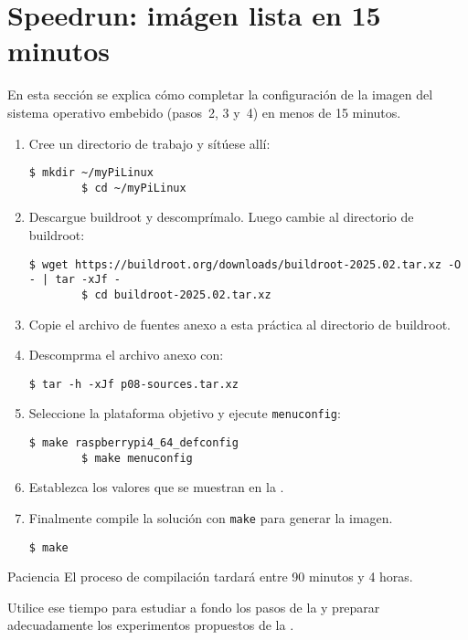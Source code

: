 %
%

\section{Speedrun: imágen lista en 15 minutos}%
\label{sec:speedrun}

En esta sección se explica cómo completar la configuración de la imagen del sistema operativo embebido (pasos~2, 3 y~4) en menos de 15 minutos.

\begin{enumerate}
	\item Cree un directorio de trabajo y sítúese allí:
	\begin{Verbatim}[gobble=2]
		$ mkdir ~/myPiLinux
		$ cd ~/myPiLinux
	\end{Verbatim}

	\item Descargue buildroot y descomprímalo.
	Luego cambie al directorio de buildroot:
	\begin{Verbatim}[gobble=2]
		$ wget https://buildroot.org/downloads/buildroot-2025.02.tar.xz -O - | tar -xJf -
		$ cd buildroot-2025.02.tar.xz
	\end{Verbatim}

	\item Copie el archivo de fuentes anexo a esta práctica al directorio de buildroot.

	\item Descomprma el archivo anexo con:
	\begin{Verbatim}[gobble=2]
		$ tar -h -xJf p08-sources.tar.xz
	\end{Verbatim}

	\item Seleccione la plataforma objetivo y ejecute \texttt{menuconfig}:
	\begin{Verbatim}[gobble=2]
		$ make raspberrypi4_64_defconfig
		$ make menuconfig
	\end{Verbatim}

	\item Establezca los valores que se muestran en la .

	\item Finalmente compile la solución con \texttt{make} para generar la imagen.
	\begin{Verbatim}[gobble=2]
		$ make
	\end{Verbatim}
\end{enumerate}

\begin{greenbox}{Paciencia}
El proceso de compilación tardará entre 90 minutos y 4 horas.

\medskip{}

Utilice ese tiempo para estudiar a fondo los pasos de la  y preparar adecuadamente los experimentos propuestos de la .
\end{greenbox}
